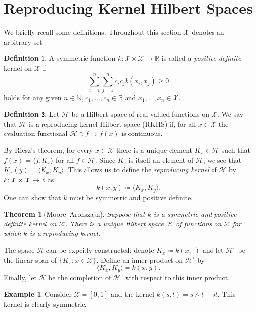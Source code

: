 \documentclass[10pt, reqno]{article}
\theoremstyle{definition}
\newtheorem{definition}{Definition}
\newtheorem{example}{Example}
\theoremstyle{plain}
\newtheorem{theorem}{Theorem}
\newcommand{\R}{\mathbb{R}}
\newcommand{\N}{\mathbb{N}}
\newcommand{\X}{\mathscr{X}}
\renewcommand{\H}{\mathscr{H}}
\begin{document}
\section{Reproducing Kernel Hilbert Spaces}
We briefly recall some definitions. Throughout this section \(\X\) denotes an arbitrary set
\begin{definition}
	A symmetric function \(k\colon\X\times\X\to\R\) is called a \emph{positive-definite} kernel on \(\X\) if
	\[
		\sum_{i=1}^n\sum_{j=1}^nc_ic_jk(x_i,x_j)\ge 0
	\]
	holds for any given \(n\in\N\), \(c_1,\dotsc,c_n\in\R\) and \(x_1,\dotsc,x_n\in\X\).
\end{definition}
\begin{definition}
	Let \(\H\) be a Hilbert space of real-valued functions on \(\X\).
	We say that \(\H\) is a reproducing kernel Hilbert space (RKHS) if, for all \(x\in\X\) the evaluation functional \(\H\ni f\mapsto f(x)\) is
	continuous.
\end{definition}

By Riesz's theorem, for every \(x\in\X\) there is a unique element \(K_x\in\H\) such that \(f(x)=\langle f, K_x\rangle\) for all \(f\in\H\).
Since \(K_x\) is itself an element of \(\H\), we see that \(K_x(y)=\langle K_x, K_y\rangle\).
This allows us to define the \emph{reproducing kernel} of \(\H\) by \(k\colon\X\times\X\to\R\) as
\[
	k(x,y)\coloneqq \langle K_x,K_y\rangle.
\]
One can show that \(k\) must be symmetric and positive definite.

\begin{theorem}[Moore--Aronszajn]
	\label{thm:MA}
	Suppose that \(k\) is a symmetric and positive definite kernel on \(\X\). There is a unique Hilbert space \(\H\) of functions on \(\X\) for which \(k\)
	is a reproducing kernel.
\end{theorem}

The space \(\H\) can be expcitly constructed: denote \(K_x\coloneq k(x,\cdot)\) and let \(\H^\circ\) be the linear span of \(\{K_x:x\in\X\}\). Define an inner product on \(\H^\circ\) by
\[
	\langle K_x,K_y\rangle=k(x,y).
\]
Finally, let \(\H\) be the completion of \(\H^\circ\) with respect to this inner product.


\begin{example}
	Consider \(\X=[0,1]\) and the kernel \(k(s,t)=s\wedge t-st\).
	This kernel is clearly symmetric.
\end{example}
\end{document}

